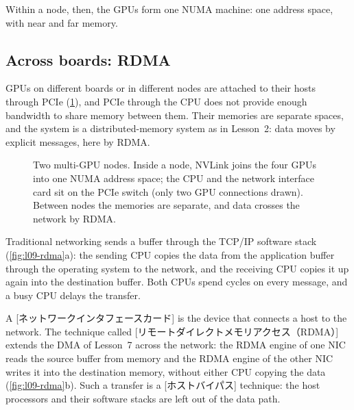 \documentclass[../main.tex]{subfiles}
\begin{document}
%
Within a node, then, the GPUs form one NUMA machine: one address space,
with near and far memory.

\subsection{Across boards: RDMA}

GPUs on different boards or in different nodes are attached to their
hosts through PCIe (\cref{fig:l09-nodes}), and PCIe through the CPU
does not provide enough bandwidth to share memory between them.  Their
memories are separate spaces, and the system is a distributed-memory
system as in Lesson~2: data moves by explicit messages, here by RDMA.

\begin{figure}[tb]
  \centering
  
  \caption{Two multi-GPU nodes.  Inside a node, NVLink joins the four
    GPUs into one NUMA address space; the CPU and the network interface
    card sit on the PCIe switch (only two GPU connections drawn).  Between
    nodes the memories are separate, and data crosses the network by
    RDMA.}
  \label{fig:l09-nodes}
\end{figure}

Traditional networking sends a buffer through the TCP/IP software stack
(\cref{fig:l09-rdma}a): the sending CPU copies the data from the
application buffer through the operating system to the network, and the
receiving CPU copies it up again into the destination buffer.  Both
CPUs spend cycles on every message, and a busy CPU delays the transfer.

\begin{definition}
  A [ネットワークインタフェースカード]
  is the device that connects a host to the network.
  The technique called
  [リモートダイレクトメモリアクセス（RDMA）]
  extends the DMA of Lesson~7 across the network: the RDMA engine of
  one NIC reads the source buffer from memory and the RDMA engine of the
  other NIC writes it into the destination memory, without either CPU
  copying the data (\cref{fig:l09-rdma}b).  Such a transfer is a
  [ホストバイパス] technique: the host processors and
  their software stacks are left out of the data path.
\end{definition}
\end{document}
